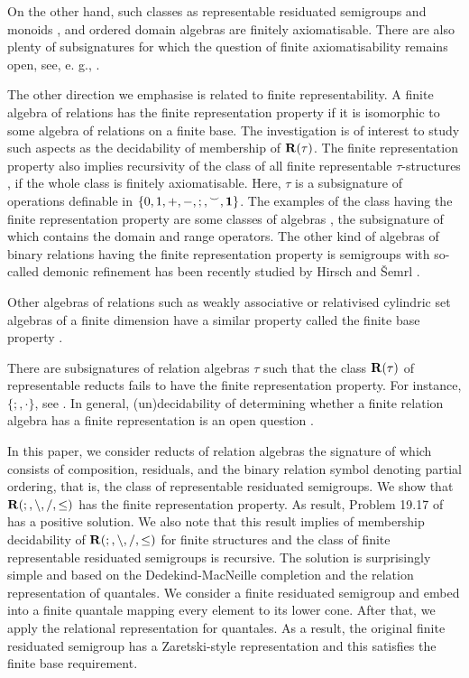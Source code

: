 \documentclass[a4paper]{article}
\theoremstyle{definition}
\theoremstyle{theorem}
\theoremstyle{proposition}
\theoremstyle{lemma}
\theoremstyle{ex}
\theoremstyle{corollary}
\theoremstyle{claim}
\begin{document}
On the other hand, such classes as representable residuated semigroups and monoids \cite{andreka1994lambek}, and ordered domain algebras \cite{hirsch2013ordered} are finitely axiomatisable. There are also plenty of subsignatures for which the question of finite axiomatisability remains open, see, e. g., \cite{andreka2011axiomatizability}.

The other direction we emphasise is related to finite representability. A finite algebra of relations has the finite representation property if it is isomorphic to some algebra of relations on a finite base. The investigation is of interest to study such aspects as the decidability of membership of ${\bf R}(\tau)$. The finite representation property also implies recursivity of the class of all finite representable $\tau$-structures \cite{hirsch2004finite}, if the whole class is finitely axiomatisable.  Here, $\tau$ is a subsignature of operations definable in $\{ 0, 1, +, -, ;, {}^{\smile}, {\bf 1 } \}$. The examples of the class having the finite representation property are some classes of algebras \cite{hirsch2004finite} \cite{hirsch2013ordered} \cite{mclean2016finite}, the subsignature of which contains the domain and range operators. The other kind of algebras of binary relations having the finite representation property is semigroups with so-called demonic refinement has been recently studied by Hirsch and \v{S}emrl \cite{hirsch2020finite}.

Other algebras of relations such as weakly associative or relativised cylindric set algebras of a finite dimension have a similar property called the finite base property \cite{andreka1999finite}.

There are subsignatures of relation algebras $\tau$ such that
the class ${\bf R}(\tau)$ of representable reducts fails to have the finite representation property. For instance, $\{;, \cdot\}$, see \cite{maddux2016finite}. In general, (un)decidability of determining whether a finite relation algebra has a finite representation is an open question \cite[Problem 18.18]{hirsch2002relation}.

In this paper, we consider reducts of relation algebras the signature of which consists of composition, residuals, and the binary relation symbol denoting partial ordering, that is, the class of representable residuated semigroups. We show that ${\bf R}(;, \setminus, /, \leq)$ has the finite representation property. As result, Problem 19.17 of \cite{hirsch2002relation} has a positive solution. We also note that this result implies of membership decidability of ${\bf R}(;, \setminus, /, \leq)$ for finite structures and the class of finite representable residuated semigroups is recursive. The solution is surprisingly simple and based on the Dedekind-MacNeille completion and the relation representation of quantales. We consider a finite residuated semigroup and embed into a finite quantale mapping every element to its lower cone. After that, we apply the relational representation for quantales. As a result, the original finite residuated semigroup has a Zaretski-style representation \cite{zaretskii1959representation} and this satisfies the finite base requirement.
\end{document}
